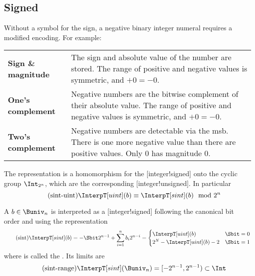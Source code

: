\subsection{Signed}

Without a symbol for the sign, a negative binary integer numeral requires a modified encoding.
For example:

\begin{tabularx}{\textwidth}{>{\bfseries}lX}
    Sign \& magnitude &

    The sign and absolute value of the number are stored.
    The range of positive and negative values is symmetric, and \(+0=-0\).\\

    One's complement &

    Negative numbers are the bitwise complement of their absolute value.
    The range of positive and negative values is symmetric, and \(+0=-0\).\\

    Two's complement &

    Negative numbers are detectable via the \gls{msb}.
    There is one more negative value than there are positive values.
    Only \(0\) has magnitude \(0\).
\end{tabularx}

The  representation is a homomorphism for the [integer!signed] onto the cyclic group \(\Int_{2^n}\), which are the corresponding [integer!unsigned].
In particular
\begin{equation*}
    \label{eq:sint_uint}
    \tag{sint-uint}
    \InterpT[uint](b) \equiv \InterpT[sint](b) \mod 2^n
\end{equation*}

\begin{definition}
    A  \(b \in \Buniv_n\) is interpreted as a [integer!signed] following the canonical bit order and using the  representation
    \begin{equation}
        \label{eq:sint}
        \tag{sint}
        \InterpT[sint](b) = -\Sbit 2^{n-1} + \sum_{i=1}^{n} b_i 2^{n-i} = \begin{cases}
            \InterpT[uint](b) & \Sbit = 0 \\
            2^N - \InterpT[uint](b) - 2 & \Sbit = 1
        \end{cases}
    \end{equation}
    where \Sbit{} is called the .
    Its limits are
    \begin{equation}
        \label{eq:sint_range}
        \tag{sint-range}
        \InterpT[sint](\Buniv_n) = [-2^{n-1}, 2^{n-1}) \subset \Int
    \end{equation}
\end{definition}

